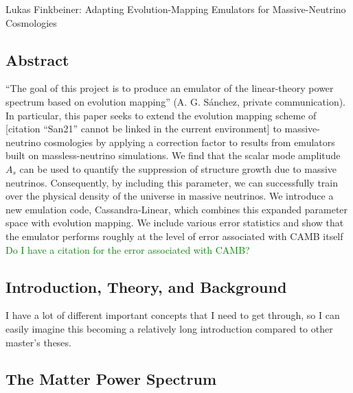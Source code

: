 \documentclass[11pt]{article}
\newcommand{\cbib}[1]
{\IfFileExists{biblatex.sty}
{\cite{#1}}
{[citation ``#1'' cannot be linked in the current environment]}}
\begin{document}
\fontsize{12}{15}

\begin{center}
Lukas Finkbeiner: Adapting Evolution-Mapping Emulators for Massive-Neutrino Cosmologies
\end{center}

\tableofcontents

\begin{centering}
\section{Abstract}
\end{centering}

``The goal of this project is to produce an emulator of the linear-theory
power spectrum based on evolution mapping'' (A. G. S\'{a}nchez, private
communication). In particular, this paper seeks to extend the evolution
mapping scheme of \cbib{San21} to massive-neutrino cosmologies by applying a
correction
factor to results from emulators built on massless-neutrino simulations. We
find that the scalar mode amplitude $A_s$ can be used to quantify the
suppression of structure growth due to massive neutrinos. Consequently, by
including this parameter, we can successfully train over the physical density
of the universe in massive neutrinos. We introduce a new emulation code,
Cassandra-Linear, which combines this expanded parameter space with evolution
mapping. We include various error statistics and show that the emulator
performs roughly at the level of error associated with CAMB itself
\textcolor{green}{Do I have a citation for the error associated with CAMB?}

\begin{centering}
\section{Introduction, Theory, and Background}
\end{centering}

I have a lot of different important concepts that I need to get through, so I can easily imagine this becoming a relatively long introduction compared to other master's theses.

\begin{centering}
\subsection{The Matter Power Spectrum}
\end{centering}
\end{document}
